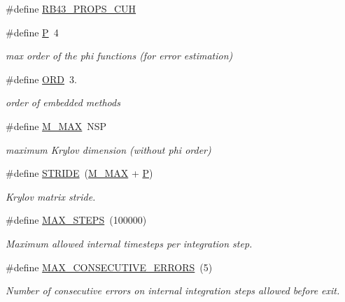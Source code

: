 \begin{DoxyCompactItemize}
\item 
\#define \hyperlink{exprb43__props_8cuh_a662425e5e115738094e7136bcfea795f}{R\+B43\+\_\+\+P\+R\+O\+P\+S\+\_\+\+C\+UH}
\item 
\#define \hyperlink{exprb43__props_8cuh_a2748566f4c443ee77aa831e63dbb5ebe}{P}~4
\begin{DoxyCompactList}\small\item\em max order of the phi functions (for error estimation) \end{DoxyCompactList}\item 
\#define \hyperlink{exprb43__props_8cuh_ac5232262b17b940a7b54e6e56439aa24}{O\+RD}~3.
\begin{DoxyCompactList}\small\item\em order of embedded methods \end{DoxyCompactList}\item 
\#define \hyperlink{exprb43__props_8cuh_a61819141b0164a35f4d791b0e696721f}{M\+\_\+\+M\+AX}~N\+SP
\begin{DoxyCompactList}\small\item\em maximum Krylov dimension (without phi order) \end{DoxyCompactList}\item 
\#define \hyperlink{exprb43__props_8cuh_a351d54267048643c4365f6a24641d0cf}{S\+T\+R\+I\+DE}~(\hyperlink{exprb43__props_8h_a61819141b0164a35f4d791b0e696721f}{M\+\_\+\+M\+AX} + \hyperlink{exprb43__props_8h_a2748566f4c443ee77aa831e63dbb5ebe}{P})
\begin{DoxyCompactList}\small\item\em Krylov matrix stride. \end{DoxyCompactList}\item 
\#define \hyperlink{exprb43__props_8cuh_aa0414caef00a64a51d4c6c0711d9e70a}{M\+A\+X\+\_\+\+S\+T\+E\+PS}~(100000)
\begin{DoxyCompactList}\small\item\em Maximum allowed internal timesteps per integration step. \end{DoxyCompactList}\item 
\#define \hyperlink{exprb43__props_8cuh_a0f51553c710580b9899756f7ad472c93}{M\+A\+X\+\_\+\+C\+O\+N\+S\+E\+C\+U\+T\+I\+V\+E\+\_\+\+E\+R\+R\+O\+RS}~(5)
\begin{DoxyCompactList}\small\item\em Number of consecutive errors on internal integration steps allowed before exit. \end{DoxyCompactList}\item 

\end{DoxyCompactItemize}
